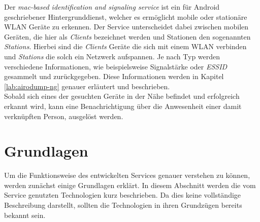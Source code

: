 \documentclass[]{report}
\begin{document}
Der \textit{mac-based identification and signaling service} ist ein für Android geschriebener Hintergrunddienst, welcher es ermöglicht mobile oder stationäre WLAN Geräte zu erkennen. Der Service unterscheidet dabei zwischen mobilen Geräten, die hier als \textit{Clients} bezeichnet werden und Stationen den sogenannten \textit{Stations}. Hierbei sind die \textit{Clients} Geräte die sich mit einem WLAN verbinden und \textit{Stations} die solch ein Netzwerk aufspannen. Je nach Typ werden verschiedene Informationen, wie beispielsweise Signalstärke oder \textit{ESSID} gesammelt und zurückgegeben. Diese Informationen werden in Kapitel \ref{lab:airodump-ng} genauer erläutert und beschrieben.\\
Sobald sich eines der gesuchten Geräte in der Nähe befindet und erfolgreich erkannt wird, kann eine Benachrichtigung über die Anwesenheit einer damit verknüpften Person, ausgelöst werden.
\chapter{Grundlagen}
Um die Funktionsweise des entwickelten Services genauer verstehen zu können, werden zunächst einige Grundlagen erklärt. In diesem Abschnitt werden die vom Service genutzten Technologien kurz beschrieben. Da dies keine vollständige Beschreibung darstellt, sollten die Technologien in ihren Grundzügen bereits bekannt sein. 
\end{document}
